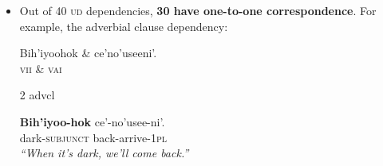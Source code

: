 \documentclass[portrait,a0paper,fontscale=0.36]{baposter} %
\begin{document}
\begin{poster}

{ \vspace{8px}
\begin{itemize}
\item Out of 40 \textsc{ud} dependencies, \textbf{30 have one-to-one correspondence}. For example, the adverbial clause dependency:
\footnotesize
\begin{exe}
\ex \label{advcl} %
\begin{dependency}
\begin{deptext}
Bih'iyoohok \& ce'no'useeni'.\\
\textsc{vii} \& \textsc{vai}\\
\end{deptext}
	{2}	{advcl}
\end{dependency}
\gll \textbf{Bih'iyoo-hok} ce'-no'usee-ni'.\\
{dark-\textsc{subjunct}} {back-arrive-\textsc{1pl}}\\
\trans \textit{``When it's dark, we'll come back.''}
\end{exe}


\end{itemize}}
\end{poster}
\end{document}
